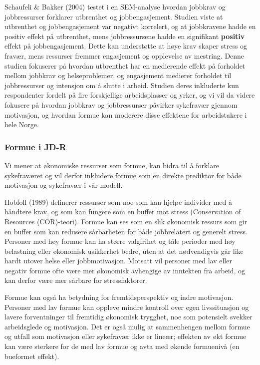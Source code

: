 \documentclass[
  12pt,
  a4paper,
  DIV=11,
  numbers=noendperiod]{scrartcl}
\begin{document}
Schaufeli \& Bakker (2004) testet i en SEM-analyse hvordan jobbkrav og
jobbressurser forklarer utbrenthet og jobbengasjement. Studien viste at
utbrenthet og jobbengasjement var negativt korrelert, og at jobbkravene
hadde en positiv effekt på utbrenthet, mens jobbressursene hadde en
signifikant \textbf{positiv} effekt på jobbengasjement. Dette kan
understøtte at høye krav skaper stress og fravær, mens ressurser fremmer
engasjement og opplevelse av mestring. Denne studien fokuserer på
hvordan utbrenthet har en medierende effekt på forholdet mellom jobbkrav
og helseproblemer, og engasjement medierer forholdet til jobbressurser
og intensjon om å slutte i arbeid. Studien deres inkluderte kun
respondenter fordelt på fire forskjellige arbeidsplasser og yrker, og vi
vil da videre fokusere på hvordan jobbkrav og jobbressurser påvirker
sykefravær gjennom motivasjon, og hvordan formue kan moderere disse
effektene for arbeidstakere i hele Norge.

\subsubsection{Formue i JD-R}\label{sec-formue-jdr}

Vi mener at økonomiske ressurser som formue, kan bidra til å forklare
sykefraværet og vil derfor inkludere formue som en direkte prediktor for
både motivasjon og sykefravær i vår modell.

Hobfoll (1989) definerer ressurser som noe som kan hjelpe individer med
å håndtere krav, og som kan fungere som en buffer mot stress
(Conservation of Resources (COR)-teori). Formue kan ses som en slik
økonomisk ressurs som gir en buffer som kan redusere sårbarheten for
både jobbrelatert og generelt stress. Personer med høy formue kan ha
større valgfrihet og tåle perioder med høy belastning eller økonomisk
usikkerhet bedre, uten at det nødvendigvis går like hardt utover helse
eller jobbmotivasjon. Motsatt vil personer med lav eller negativ formue
ofte være mer økonomisk avhengige av inntekten fra arbeid, og kan derfor
være mer sårbare for stressfaktorer.

Formue kan også ha betydning for fremtidsperspektiv og indre motivasjon.
Personer med lav formue kan oppleve mindre kontroll over egen
livssituasjon og lavere forventninger til fremtidig økonomisk trygghet,
noe som potensielt svekker arbeidsglede og motivasjon. Det er også mulig
at sammenhengen mellom formue og utfall som motivasjon eller sykefravær
ikke er lineær; effekten av økt formue kan være sterkere for de med lav
formue og avta med økende formuenivå (en bueformet effekt).
\end{document}
